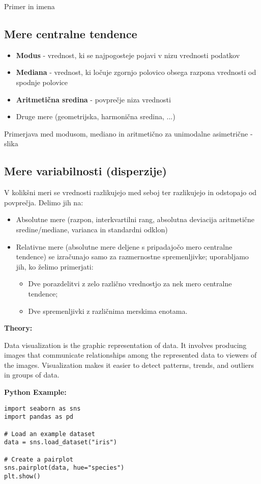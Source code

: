 Primer in imena

\subsection*{Mere centralne tendence}
\begin{itemize}
    \item \textbf{Modus} - vrednost, ki se najpogosteje pojavi v nizu vrednosti podatkov
    \item \textbf{Mediana} - vrednost, ki ločuje zgornjo polovico obsega razpona vrednosti od spodnje polovice
    \item \textbf{Aritmetična sredina} - povprečje niza vrednosti
    \item Druge mere (geometrijska, harmonična sredina, ...)
\end{itemize}
Primerjava med modusom, mediano in aritmetično za unimodalne asimetrične - slika

\subsection*{Mere variabilnosti (disperzije)}
V kolikšni meri se vrednosti razlikujejo med seboj ter razlikujejo in odstopajo od povprečja. Delimo jih na:
\begin{itemize}
    \item Absolutne mere (razpon, interkvartilni rang, absolutna deviacija aritmetične sredine/mediane, varianca in standardni odklon) 
    \item Relativne mere (absolutne mere deljene s pripadajočo mero centralne tendence) se izračunajo samo za razmernostne spremenljivke; uporabljamo jih, ko želimo primerjati:
    \begin{itemize}
        \item Dve porazdelitvi z zelo različno vrednostjo za nek mero centralne tendence;
        \item Dve spremenljivki z različnima merskima enotama.
    \end{itemize}
\end{itemize}


\begin{multicols}{2}
\noindent
\textbf{Theory:}

Data visualization is the graphic representation of data. It involves producing images that communicate relationships among the represented data to viewers of the images. Visualization makes it easier to detect patterns, trends, and outliers in groups of data.

\columnbreak

\textbf{Python Example:}

\begin{verbatim}
import seaborn as sns
import pandas as pd

# Load an example dataset
data = sns.load_dataset("iris")

# Create a pairplot
sns.pairplot(data, hue="species")
plt.show()
\end{verbatim}
\end{multicols}